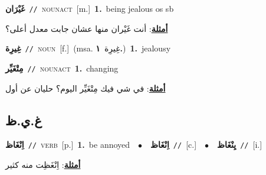 \documentclass[10pt,a4paper,twoside]{article} %
\begin{document}
\begin{multicols}{2}
{\setlength\topsep{0pt}\textbf{\foreignlanguage{arabic}{غَيْرَان}}\ {\color{gray}\texttt{//}\color{black}}\ \textsc{noun\textunderscore act}\ [m.]\ \textbf{1.}~being jealous os sb\  \begin{flushright}\color{gray}\foreignlanguage{arabic}{\textbf{\underline{\foreignlanguage{arabic}{أمثلة}}}: أنت غَيْران منها عشان جابت معدل أعلى؟}\end{flushright}\color{black}} \vspace{2mm}

{\setlength\topsep{0pt}\textbf{\foreignlanguage{arabic}{غِيرِة}}\ {\color{gray}\texttt{//}\color{black}}\ \textsc{noun}\ [f.]\ \color{gray}(msa. \foreignlanguage{arabic}{غِيرِة}~\foreignlanguage{arabic}{\textbf{١.}})\color{black}\ \textbf{1.}~jealousy\ } \vspace{2mm}

{\setlength\topsep{0pt}\textbf{\foreignlanguage{arabic}{مِتْغَيِّر}}\ {\color{gray}\texttt{//}\color{black}}\ \textsc{noun\textunderscore act}\ \textbf{1.}~changing\  \begin{flushright}\color{gray}\foreignlanguage{arabic}{\textbf{\underline{\foreignlanguage{arabic}{أمثلة}}}: في شي فيك مِتْغَيِّر اليوم؟ حليان عن أول}\end{flushright}\color{black}} \vspace{2mm}

\vspace{-3mm}
\subsection*{\color{blue}\foreignlanguage{arabic}{غ.ي.ظ}\color{blue}{}} 

{\setlength\topsep{0pt}\textbf{\foreignlanguage{arabic}{اِنْغَاظ}}\ {\color{gray}\texttt{//}\color{black}}\ \textsc{verb}\ [p.]\ \textbf{1.}~be annoyed\ \ $\bullet$\ \ \setlength\topsep{0pt}\textbf{\foreignlanguage{arabic}{اِنْغَاظ}}\ {\color{gray}\texttt{//}\color{black}}\ [c.]\ \ $\bullet$\ \ \setlength\topsep{0pt}\textbf{\foreignlanguage{arabic}{يِنْغَاظ}}\ {\color{gray}\texttt{//}\color{black}}\ [i.]\  \begin{flushright}\color{gray}\foreignlanguage{arabic}{\textbf{\underline{\foreignlanguage{arabic}{أمثلة}}}: اِنْغَظِت منه كثير}\end{flushright}\color{black}} \vspace{2mm}


\end{multicols}
\end{document}
